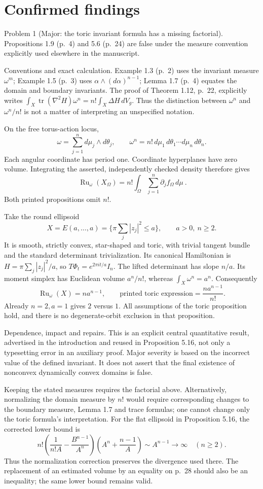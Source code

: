 \documentclass[10pt]{article}
\begin{document}
\section*{Confirmed findings}
Problem 1 (Major: the toric invariant formula has a missing factorial).  Propositions 1.9 (p. 4) and 5.6 (p. 24) are false under the measure convention explicitly used elsewhere in the manuscript.\par
Conventions and exact calculation. Example 1.3 (p. 2) uses the invariant measure \(\omega^m\); Example 1.5 (p. 3) uses \(\alpha\wedge(d\alpha)^{n-1}\); Lemma 1.7 (p. 4) equates the domain and boundary invariants. The proof of Theorem 1.12, p. 22, explicitly writes \(\int_X\operatorname{tr}(\nabla^2H)\omega^n=n!\int_X\Delta H\,dV_g\). Thus the distinction between \(\omega^n\) and \(\omega^n/n!\) is not a matter of interpreting an unspecified notation.\par
On the free torus-action locus, \[\omega=\sum_{j=1}^n d\mu_j\wedge d\theta_j,\qquad
 \omega^n=n!\,d\mu_1\,d\theta_1\cdots d\mu_n\,d\theta_n.\] Each angular coordinate has period one. Coordinate hyperplanes have zero volume. Integrating the asserted, independently checked density therefore gives \[\boxed{\ \operatorname{Ru}_\omega(X_\Omega)
       =n!\int_\Omega\sum_{j=1}^n\partial_jf_\Omega\,d\mu\ }.\] Both printed propositions omit \(n!\).\par
Take the round ellipsoid \[X=E(a,\ldots,a)=\{\pi\textstyle\sum_j|z_j|^2\le a\},\qquad a>0,\ n\ge2.\] It is smooth, strictly convex, star-shaped and toric, with trivial tangent bundle and the standard determinant trivialization. Its canonical Hamiltonian is \(H=\pi\sum_j|z_j|^2/a\), so \(T\Phi_t=e^{2\pi it/a}I_n\). The lifted determinant has slope \(n/a\). Its moment simplex has Euclidean volume \(a^n/n!\), whereas \(\int_X\omega^n=a^n\). Consequently \[\operatorname{Ru}_\omega(X)=n a^{n-1},
 \qquad
 \text{printed toric expression}=\frac{n a^{n-1}}{n!}.\] Already \(n=2,a=1\) gives \(2\) versus \(1\). All assumptions of the toric proposition hold, and there is no degenerate-orbit exclusion in that proposition.\par
Dependence, impact and repairs. This is an explicit central quantitative result, advertised in the introduction and reused in Proposition 5.16, not only a typesetting error in an auxiliary proof. Major severity is based on the incorrect value of the defined invariant. It does not assert that the final existence of nonconvex dynamically convex domains is false.\par
Keeping the stated measures requires the factorial above. Alternatively, normalizing the domain measure by \(n!\) would require corresponding changes to the boundary measure, Lemma 1.7 and trace formulas; one cannot change only the toric formula’s interpretation. For the flat ellipsoid in Proposition 5.16, the corrected lower bound is \[n!\left(\frac{1}{n!A}-\frac{B^{n-1}}{A^n}\right)
       \left(A^n+\frac{n-1}{A}\right)
       \sim A^{n-1}\longrightarrow\infty
 \quad(n\ge2).\] Thus the normalization correction preserves the divergence used there. The replacement of an estimated volume by an equality on p. 28 should also be an inequality; the same lower bound remains valid.\par
\end{document}
